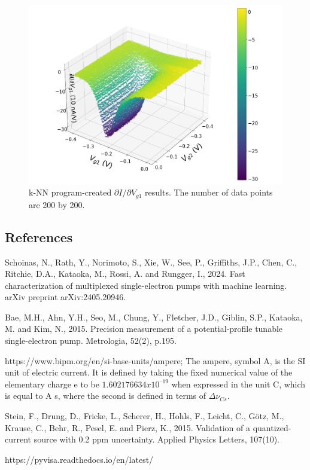 \documentclass[jkps,preprint,fleqn,showpacs,showkeys]{revtex4}
\begin{document}
\renewcommand{\figurename}{Fig. }
\begin{figure}[b]
\centering
\includegraphics[width=12cm]{Fig_didv}
\parbox{13cm}{\vspace*{0.5cm}
\caption{k-NN program-created $\partial I/\partial V_{g1}$ results. The number of data points are 200 by
200. }
\label{plot1}}
\end{figure}



\begin{thebibliography}{99}
\section*{References}

Schoinas, N., Rath, Y., Norimoto, S., Xie, W., See, P., Griffiths, J.P., Chen, C., Ritchie, D.A., Kataoka, M., Rossi, A. and Rungger, I., 2024. Fast characterization of multiplexed single-electron pumps with machine learning. arXiv preprint arXiv:2405.20946.


Bae, M.H., Ahn, Y.H., Seo, M., Chung, Y., Fletcher, J.D., Giblin, S.P., Kataoka, M. and Kim, N., 2015. Precision measurement of a potential-profile tunable single-electron pump. Metrologia, 52(2), p.195.


https://www.bipm.org/en/si-base-units/ampere;
The ampere, symbol A, is the SI unit of electric current. It is defined by taking the fixed numerical value of the elementary charge e to be $1.602 176 634 x 10^{–19}$ when expressed in the unit C, which is equal to A s, where the second is defined in terms of $\Delta \nu _{Cs}$.

Stein, F., Drung, D., Fricke, L., Scherer, H., Hohls, F., Leicht, C., Götz, M., Krause, C., Behr, R., Pesel, E. and Pierz, K., 2015. Validation of a quantized-current source with 0.2 ppm uncertainty. Applied Physics Letters, 107(10).

https://pyvisa.readthedocs.io/en/latest/





\end{thebibliography}
\end{document}
